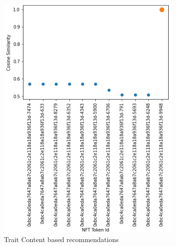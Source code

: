 \begin{figure}[h!]
     \centering
     \begin{subfigure}[b]{0.45\textwidth}
         \centering
         \includegraphics[width=\textwidth]{images/Testing/Cosine Similarities of Recommended NFTs - Trait Content Based Recomendations Model.png}
         \caption{Trait Content based recommendations}
         \label{fig:trait-content-output}
     \end{subfigure}
     \hfill
     \begin{subfigure}[b]{0.45\textwidth}
         \centering

\end{subfigure}
\end{figure}
